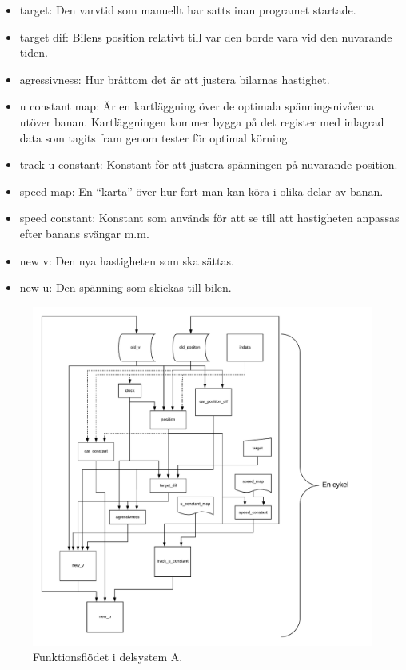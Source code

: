 \begin{itemize}
      \item target: Den varvtid som manuellt har satts inan programet startade.
      \item target dif: Bilens position relativt till var den borde vara vid den nuvarande tiden.
      \item agressivness: Hur bråttom det är att justera bilarnas hastighet.
      \item u constant map: Är en kartläggning över de optimala spänningsnivåerna utöver banan. Kartläggningen kommer bygga på det register med inlagrad data som tagits fram genom tester för optimal körning.
      \item track u constant: Konstant för att justera spänningen på nuvarande position.
      \item speed map: En ``karta'' över hur fort man kan köra i olika delar av banan.
      \item speed constant: Konstant som används för att se till att hastigheten anpassas efter banans svängar m.m.
      \item new v: Den nya hastigheten som ska sättas.
      \item new u: Den spänning som skickas till bilen.
    \end{itemize}

    \begin{figure}
      \centering
      \includegraphics[width=\linewidth]{figures/flow.pdf}
      \caption{Funktionsflödet i delsystem A.}%
      \label{fig:flow_diagram}
    \end{figure}

